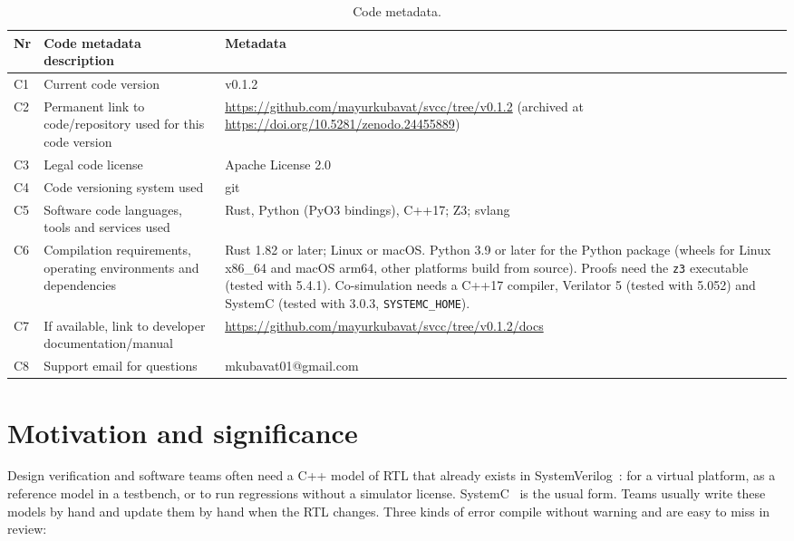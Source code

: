 \documentclass[preprint,12pt]{elsarticle}
\newcommand{\code}[1]{\texttt{#1}}
\begin{document}
\begin{table}[h]
\centering\small
\begin{tabularx}{\textwidth}{@{}l >{\raggedright\arraybackslash}p{} >{\raggedright\arraybackslash}X@{}}
\toprule
Nr & Code metadata description & Metadata \\
\midrule
C1 & Current code version & v0.1.2 \\
C2 & Permanent link to code/repository used for this code version & \url{https://github.com/mayurkubavat/svcc/tree/v0.1.2} (archived at \url{https://doi.org/10.5281/zenodo.24455889}) \\
C3 & Legal code license & Apache License 2.0 \\
C4 & Code versioning system used & git \\
C5 & Software code languages, tools and services used & Rust, Python (PyO3 bindings), C++17; Z3; svlang \\
C6 & Compilation requirements, operating environments and dependencies & Rust 1.82 or later; Linux or macOS. Python 3.9 or later for the Python package (wheels for Linux x86\_64 and macOS arm64, other platforms build from source). Proofs need the \code{z3} executable (tested with 5.4.1). Co-simulation needs a C++17 compiler, Verilator 5 (tested with 5.052) and SystemC (tested with 3.0.3, \code{SYSTEMC\_HOME}). \\
C7 & If available, link to developer documentation/manual & \url{https://github.com/mayurkubavat/svcc/tree/v0.1.2/docs} \\
C8 & Support email for questions & mkubavat01@gmail.com \\
\bottomrule
\end{tabularx}
\caption{Code metadata.}
\end{table}

\section{Motivation and significance}
\label{sec:motivation}

Design verification and software teams often need a C++ model of RTL that already exists in
SystemVerilog~\cite{ieee1800_2023}: for a virtual platform, as a reference model in a testbench,
or to run regressions without a simulator license. SystemC~\cite{ieee1666_2023} is the usual
form. Teams usually write these models by hand and update them by hand when the RTL changes. Three
kinds of error compile without warning and are easy to miss in review:
\end{document}
